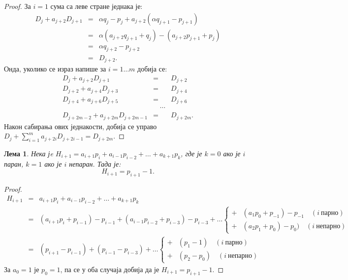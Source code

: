 \documentclass[a4paper]{article}
\newtheorem{lemma}{Лема}
\begin{document}
\begin{proof}
    За $ i = 1 $ сума са леве стране једнака је:
	\begin{eqnarray*}
		D_{j} + a_{j+2}D_{j+1} &=& \alpha q_{j} - p_{j} + a_{j+2}(\alpha q_{j+1} - p_{j+1})\\
							   &=& \alpha (a_{j+2}q_{j+1} + q_{j}) - (a_{j+2}p_{j+1} + p_{j})\\
							   &=& \alpha q_{j+2} - p_{j+2} \\
							   &=& D_{j+2}.
	\end{eqnarray*}
	Онда, уколико се израз напише за $ i= 1 \ldots m $ добија се:
	\begin{eqnarray*}
		D_{j} + a_{j+2}D_{j+1} &=& D_{j+2}\\
		D_{j+2} + a_{j+4}D_{j+3} &=& D_{j+4}\\
		D_{j+4} + a_{j+6}D_{j+5} &=& D_{j+6}\\
		&\quad\cdots& \\
		D_{j+2m-2} + a_{j+2m}D_{j+2m-1} &=& D_{j+2m}.		
	\end{eqnarray*}
	Након сабирања ових једнакости, добија се управо $ D_{j} + \sum_{i=1}^{m} a_{j+2i}D_{j+2i-1} = D_{j+2m} $.
\end{proof}

\begin{lemma}
	\label{lemma:par_nepar}
	Нека јe $ H_{i+1} = a_{i+1}p_{i} + a_{i-1}p_{i-2} + \ldots + a_{k+1}p_{k} $, где је $ k = 0 $ ако је $ i $ паран, $ k = 1 $ ако је $ i $ непаран. Тада је: 
		\begin{displaymath}
			H_{i+1} = p_{i+1} - 1.
		\end{displaymath}
\end{lemma}

\begin{proof}
	\begin{eqnarray*}
		H_{i+1} &=& a_{i+1}p_{i} + a_{i-1}p_{i-2} + \ldots + a_{k+1}p_{k}\\
				&=& (a_{i+1}p_{i} + p_{i-1}) - p_{i-1} + (a_{i-1}p_{i-2} + p_{i-3}) - p_{i-3} + \ldots \begin{cases}
					+ & (a_{1}p_{0} + p_{-1}) - p_{-1}\quad (i\ \text{парно})\\
					+ & (a_{2}p_{1} + p_{0}) - p_{0})\quad (i\ \text{непарно})
				\end{cases}\\
				&=& (p_{i+1} - p_{i-1}) + (p_{i-1} - p_{i-3}) + \ldots \begin{cases}
					+ & (p_{1} - 1)\quad (i\ \text{парно})\\
					+ & (p_{2} - p_{0})\quad (i\ \text{непарно})
				\end{cases}
	\end{eqnarray*}
	За $ a_{0} = 1 $ је $ p_{0} = 1 $, па се у оба случаја добија да је $ H_{i+1} = p_{i+1} - 1 $.
\end{proof}
\end{document}
